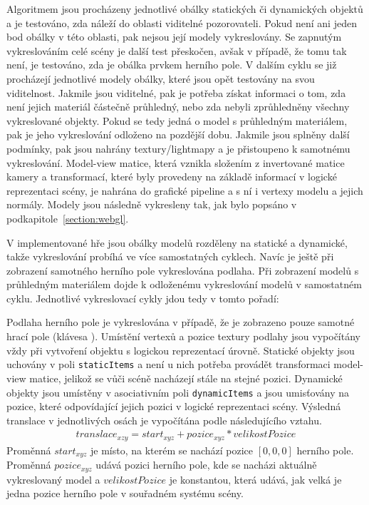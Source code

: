 Algoritmem jsou procházeny jednotlivé obálky statických či dynamických objektů a je testováno, zda náleží do oblasti viditelné pozorovateli. Pokud není ani jeden bod obálky v této oblasti, pak nejsou její modely vykreslovány. Se zapnutým vykreslováním celé scény je další test přeskočen, avšak v případě, že tomu tak není, je testováno, zda je obálka prvkem herního pole. V dalším cyklu se již procházejí jednotlivé modely obálky, které jsou opět testovány na svou viditelnost. Jakmile jsou viditelné, pak je potřeba získat informaci o tom, zda není jejich materiál částečně průhledný, nebo zda nebyli zprůhledněny všechny vykreslované objekty. Pokud se tedy jedná o model s průhledným materiálem, pak je jeho vykreslování odloženo na pozdější dobu. Jakmile jsou splněny další podmínky, pak jsou nahrány textury/lightmapy a je přistoupeno k samotnému vykreslování. Model-view matice, která vznikla složením z invertované matice kamery a transformací, které byly provedeny na základě informací v logické reprezentaci scény, je nahrána do grafické pipeline a s ní i vertexy modelu a jejich normály. Modely jsou následně vykresleny tak, jak bylo popsáno v podkapitole~\ref{section:webgl}. 

V implementované hře jsou obálky modelů rozděleny na statické a dynamické, takže vykreslování probíhá ve více samostatných cyklech. Navíc je ještě při zobrazení samotného herního pole vykreslována podlaha. Při zobrazení modelů s průhledným materiálem dojde k odloženému vykreslování modelů v samostatném cyklu. Jednotlivé vykreslovací cykly jdou tedy v tomto pořadí:


Podlaha herního pole je vykreslována v případě, že je zobrazeno pouze samotné hrací pole (klávesa ). Umístění vertexů a pozice textury podlahy jsou vypočítány vždy při vytvoření objektu s logickou reprezentací úrovně.
Statické objekty jsou uchovány v poli \texttt{staticItems} a není u nich potřeba provádět transformaci model-view matice, jelikož se vůči scéně nacházejí stále na stejné pozici.
Dynamické objekty jsou umístěny v asociativním poli \texttt{dynamicItems} a jsou umisťovány na pozice, které odpovídající jejich pozici v logické reprezentaci scény. Výsledná translace v jednotlivých osách je vypočítána podle následujícího vztahu.
\begin{align}
translace_{xzy}  = start_{xyz} + pozice_{xyz} * velikostPozice
\end{align}
Proměnná $start_{xyz}$ je místo, na kterém se nachází pozice $[0,0,0]$ herního pole. Proměnná $pozice_{xyz}$ udává pozici herního pole, kde se nacházi aktuálně vykreslovaný model a $velikostPozice$ je konstantou, která udává, jak velká je jedna pozice herního pole v souřadném systému scény. 

